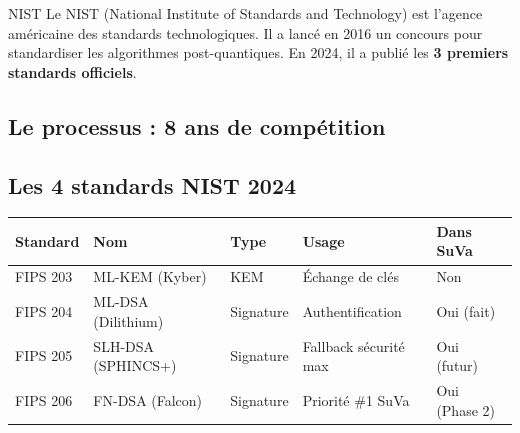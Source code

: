\documentclass[12pt, a4paper]{article}
\begin{document}
\begin{definition}{NIST}
Le NIST (National Institute of Standards and Technology) est l'agence américaine des
standards technologiques. Il a lancé en 2016 un concours pour standardiser les algorithmes
post-quantiques. En 2024, il a publié les \textbf{3 premiers standards officiels}.
\end{definition}

\subsection{Le processus : 8 ans de compétition}

\begin{center}
\end{center}

\subsection{Les 4 standards NIST 2024}

\begin{center}
\renewcommand{\arraystretch}{1.5}
\begin{tabular}{lllll}
  \toprule
  \textbf{Standard} & \textbf{Nom} & \textbf{Type} & \textbf{Usage} & \textbf{Dans SuVa} \\
  \midrule
  FIPS 203 & ML-KEM (Kyber) & KEM & Échange de clés & Non \\
  \rowcolor{suva_blue!10}
  FIPS 204 & ML-DSA (Dilithium) & Signature & Authentification & Oui (fait) \\
  \rowcolor{suva_blue!10}
  FIPS 205 & SLH-DSA (SPHINCS+) & Signature & Fallback sécurité max & Oui (futur) \\
  \rowcolor{suva_blue!10}
  FIPS 206 & FN-DSA (Falcon) & Signature & Priorité \#1 SuVa & Oui (Phase 2) \\
  \bottomrule
\end{tabular}
\end{center}
\end{document}

